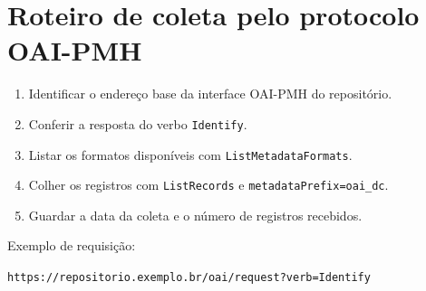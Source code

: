 \chapter{Roteiro de coleta pelo protocolo OAI-PMH}
\label{ap:coleta}


\begin{enumerate}
  \item Identificar o endereço base da interface OAI-PMH do repositório.
  \item Conferir a resposta do verbo \texttt{Identify}.
  \item Listar os formatos disponíveis com \texttt{ListMetadataFormats}.
  \item Colher os registros com \texttt{ListRecords} e \texttt{metadataPrefix=oai\_dc}.
  \item Guardar a data da coleta e o número de registros recebidos.
\end{enumerate}

\noindent Exemplo de requisição:\par\smallskip
\noindent\texttt{\small https://repositorio.exemplo.br/oai/request?verb=Identify}
